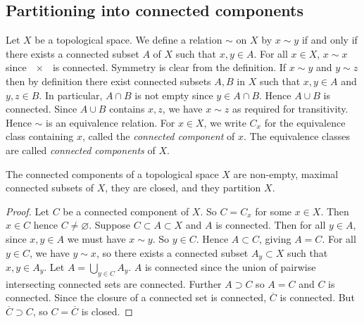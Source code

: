 \subsection{Partitioning into connected components}
\begin{definition}
	Let \( X \) be a topological space.
	We define a relation \( \sim \) on \( X \) by \( x \sim y \) if and only if there exists a connected subset \( A \) of \( X \) such that \( x, y \in A \).
	For all \( x \in X \), \( x \sim x \) since \( \qty{x} \) is connected.
	Symmetry is clear from the definition.
	If \( x \sim y \) and \( y \sim z \) then by definition there exist connected subsets \( A, B \) in \( X \) such that \( x, y \in A \) and \( y, z \in B \).
	In particular, \( A \cap B \) is not empty since \( y \in A \cap B \).
	Hence \( A \cup B \) is connected.
	Since \( A \cup B \) contains \( x, z \), we have \( x \sim z \) as required for transitivity.
	Hence \( \sim \) is an equivalence relation.
	For \( x \in X \), we write \( C_x \) for the equivalence class containing \( x \), called the \textit{connected component} of \( x \).
	The equivalence classes are called \textit{connected components} of \( X \).
\end{definition}
\begin{proposition}
	The connected components of a topological space \( X \) are non-empty, maximal connected subsets of \( X \), they are closed, and they partition \( X \).
\end{proposition}
\begin{proof}
	Let \( C \) be a connected component of \( X \).
	So \( C = C_x \) for some \( x \in X \).
	Then \( x \in C \) hence \( C \neq \varnothing \).
	Suppose \( C \subset A \subset X \) and \( A \) is connected.
	Then for all \( y \in A \), since \( x, y \in A \) we must have \( x \sim y \).
	So \( y \in C \).
	Hence \( A \subset C \), giving \( A = C \).
	For all \( y \in C \), we have \( y \sim x \), so there exists a connected subset \( A_y \subset X \) such that \( x, y \in A_y \).
	Let \( A = \bigcup_{y \in C} A_y \).
	\( A \) is connected since the union of pairwise intersecting connected sets are connected.
	Further \( A \supset C \) so \( A = C \) and \( C \) is connected.
	Since the closure of a connected set is connected, \( \overline C \) is connected.
	But \( \overline C \supset C \), so \( C = \overline C \) is closed.
\end{proof}
